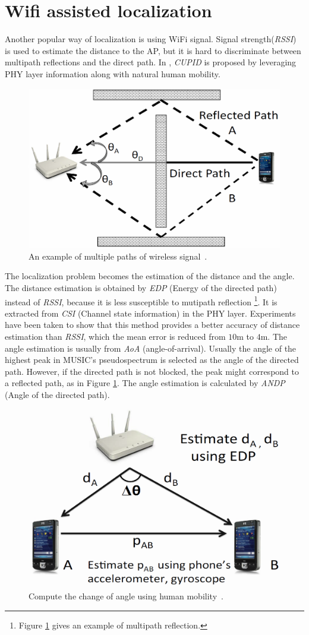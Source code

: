 \documentclass[letterpaper]{article}
\begin{document}
\section{Wifi assisted localization}

Another popular way of localization is using WiFi signal. 
Signal strength(\emph{RSSI}) is used to estimate the distance to the AP, but it is hard to discriminate between multipath reflections and the direct path.
In \cite{Nirjon:2014:CIL:2594368.2594378}, \emph{CUPID} is proposed by leveraging PHY layer information along with natural human mobility.
\begin{figure}
	\centering
	\includegraphics[width=0.7\linewidth]{fig/multipath.png}
	\caption{An example of multiple paths of wireless signal~\cite{Sen:2013:AMR:2462456.2464463}.}
	\label{fig:multipath}
\end{figure}
The localization problem becomes the estimation of the distance and the angle.
The distance estimation is obtained by \emph{EDP} (Energy of the directed path) instead of \emph{RSSI}, because it is less susceptible to mutipath reflection
\footnote{Figure \ref{fig:multipath} gives an example of multipath reflection.}.
It is extracted from \emph{CSI} (Channel state information) in the PHY layer. 
Experiments have been taken to show that this method provides a better accuracy of distance estimation than \emph{RSSI}, which the mean error is reduced from $ 10 $m to $ 4 $m.
The angle estimation is usually from \emph{AoA} (angle-of-arrival).
Usually the angle of the highest peak in MUSIC's pseudospectrum is selected as the angle of the directed path.
However, if the directed path is not blocked, the peak might correspond to a reflected path, as in Figure \ref{fig:multipath}.
The angle estimation is calculated by \emph{ANDP} (Angle of the directed path).
\begin{figure}
	\centering
	\includegraphics[width=0.7\linewidth]{fig/ANDP.png}
	\caption{Compute the change of angle using human mobility~\cite{Sen:2013:AMR:2462456.2464463}.}
	\label{fig:andp}
\end{figure}
\end{document}
